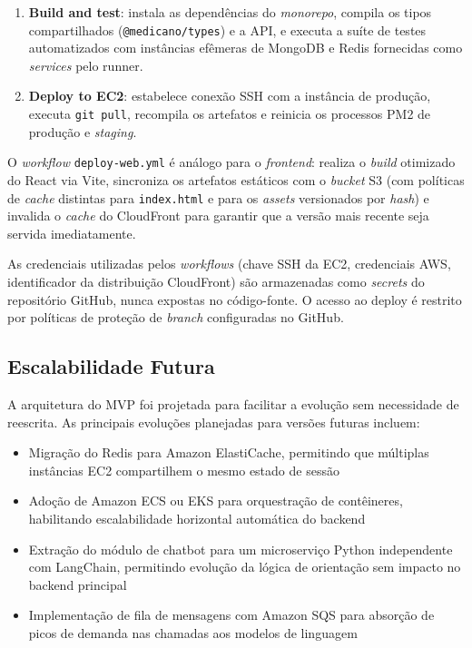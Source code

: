 \begin{enumerate}
  \item \textbf{Build and test}: instala as dependências
        do \textit{monorepo}, compila os tipos
        compartilhados (\texttt{@medicano/types}) e a API,
        e executa a suíte de testes automatizados com
        instâncias efêmeras de MongoDB e Redis fornecidas
        como \textit{services} pelo runner.
  \item \textbf{Deploy to EC2}: estabelece conexão SSH
        com a instância de produção, executa \texttt{git
        pull}, recompila os artefatos e reinicia os
        processos PM2 de produção e \textit{staging}.
\end{enumerate}

O \textit{workflow} \texttt{deploy-web.yml} é análogo
para o \textit{frontend}: realiza o \textit{build}
otimizado do React via Vite, sincroniza os artefatos
estáticos com o \textit{bucket} S3 (com políticas de
\textit{cache} distintas para \texttt{index.html} e
para os \textit{assets} versionados por \textit{hash})
e invalida o \textit{cache} do CloudFront para garantir
que a versão mais recente seja servida imediatamente.

As credenciais utilizadas pelos \textit{workflows}
(chave SSH da EC2, credenciais AWS, identificador da
distribuição CloudFront) são armazenadas como
\textit{secrets} do repositório GitHub, nunca expostas
no código-fonte. O acesso ao deploy é restrito por
políticas de proteção de \textit{branch} configuradas
no GitHub.

\subsection{Escalabilidade Futura}
\label{subsec:scalability}

A arquitetura do MVP foi projetada para facilitar
a evolução sem necessidade de reescrita. As
principais evoluções planejadas para versões
futuras incluem:

\begin{itemize}
  \item Migração do Redis para Amazon ElastiCache,
        permitindo que múltiplas instâncias EC2
        compartilhem o mesmo estado de sessão
  \item Adoção de Amazon ECS ou EKS para
        orquestração de contêineres, habilitando
        escalabilidade horizontal automática do
        backend
  \item Extração do módulo de chatbot para um
        microserviço Python independente com
        LangChain, permitindo evolução da lógica
        de orientação sem impacto no backend principal
  \item Implementação de fila de mensagens com
        Amazon SQS para absorção de picos de
        demanda nas chamadas aos modelos de
        linguagem
\end{itemize}